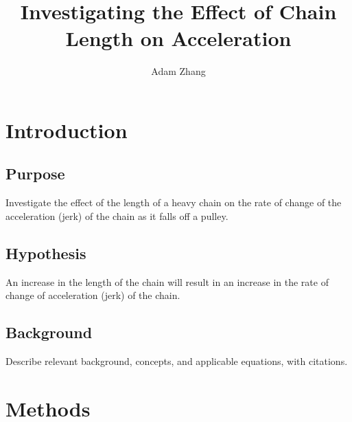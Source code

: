\documentclass[stu,biblatex,floatsintext,draftall]{apa7}
\title{Investigating the Effect of Chain Length on Acceleration}
\author{Adam Zhang}
\affiliation{Academies of Loudoun}
\begin{document}
\maketitle
\tableofcontents
\newpage

\section{Introduction}

\subsection{Purpose}
Investigate the effect of the length of a heavy chain on the rate of change of the acceleration (jerk) of the chain as it falls off a pulley.

\subsection{Hypothesis}
An increase in the length of the chain will result in an increase in the rate of change of acceleration (jerk) of the chain.

\subsection{Background}
Describe relevant background, concepts, and applicable equations, with citations.

\section{Methods}
\end{document}
